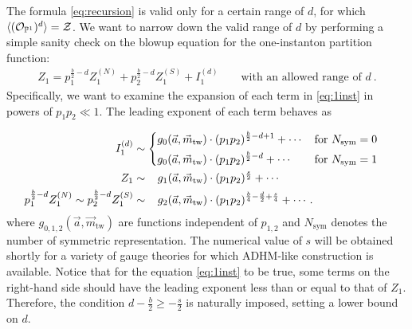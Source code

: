 \documentclass[letterpaper, 11pt]{article}
\def\IP{\mathbb{P}}
\def\CZ{{\cal Z}}
\begin{document}
The formula \eqref{eq:recursion} is valid only for a certain range of $d$, for which $\langle (\mathcal{O}_{\IP^1})^{d}\rangle = \CZ$. We want to narrow down the valid range of $d$ by performing a simple sanity check on the blowup equation for the one-instanton partition function:
\begin{align}
  \label{eq:1inst}
  Z_1 = p_1^{\frac{b}{2}-d}Z^{(N)}_1  + p_2^{\frac{b}{2}-d}  Z^{(S)}_1  + I_1^{(d)} \qquad \text{with an allowed range of $d$} \ .
\end{align}
Specifically, we want to examine the expansion of each term in \eqref{eq:1inst} in powers of $p_1p_2 \ll 1$. The  leading exponent of each term behaves as {\allowdisplaybreaks
\begin{align}
\begin{split}
  I_1^{(d)} &\sim \begin{dcases}
    g_0(\vec{a},  \vec{m}_{\text{tw}})\cdot  (p_1p_2)^{\frac{b}{2}-d + 1} + \cdots   &  \text{for }N_\text{sym} = 0\\
    g_0(\vec{a},  \vec{m}_{\text{tw}})\cdot (p_1p_2)^{\frac{b}{2}-d } + \cdots    &  \text{for }N_\text{sym} = 1
\end{dcases}
   \\
  Z_1 &\sim   \ \ \, g_1(\vec{a},  \vec{m}_{\text{tw}})\cdot (p_1p_2)^{\frac{s}{2}}  + \cdots   \\
  p_1^{\frac{b}{2}-d}Z_1^{(N)}\sim p_2^{\frac{b}{2}-d}  Z^{(S)}_1 &\sim  \ \ \,  g_2(\vec{a},  \vec{m}_{\text{tw}})\cdot  (p_1p_2)^{\frac{b}{4}-\frac{d}{2}+\frac{s}{4}}   + \cdots   .
  \end{split}
\end{align}
where $g_{0, 1, 2}(\vec{a}, \vec{m}_{\text{tw}})$ are functions independent of $p_{1, 2}$ and $N_{\text{sym}}$ denotes the number of symmetric representation. The numerical value of $s$ will be obtained shortly for a variety of gauge theories for which ADHM-like construction is available.
Notice that for the equation \eqref{eq:1inst} to be true, some terms on the right-hand side should have the leading exponent less than or equal to that of $Z_1$. Therefore, the condition $d - \frac{b}{2} \geq -\frac{s}{2}$ is naturally imposed, setting a lower bound on $d$. 

}
\end{document}
